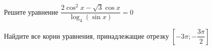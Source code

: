 \begin{ex}
	\begin{condition}
		\begin{enumcols}[label=\asbuk*)]
			\item Решите уравнение \( \dfrac{2\cos^2 x -\sqrt{3}\cos x}{\log_4 (\sin x)} = 0 \)
			\item Найдите все корни уравнения, принадлежащие отрезку \( \left[-3\pi;-\dfrac{3\pi}{2}\right] \)
		\end{enumcols}
	\end{condition}
\end{ex}